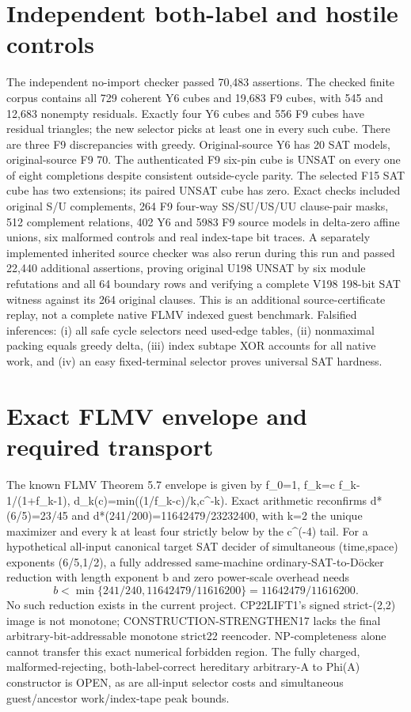 \documentclass[10pt]{article}
\begin{document}
\section{Independent both-label and hostile controls}
The independent no-import checker passed 70,483 assertions. The checked finite corpus contains all 729 coherent Y6 cubes and 19,683 F9 cubes, with 545 and 12,683 nonempty residuals. Exactly four Y6 cubes and 556 F9 cubes have residual triangles; the new selector picks at least one in every such cube. There are three F9 discrepancies with greedy. Original-source Y6 has 20 SAT models, original-source F9 70. The authenticated F9 six-pin cube is UNSAT on every one of eight completions despite consistent outside-cycle parity. The selected F15 SAT cube has two extensions; its paired UNSAT cube has zero. Exact checks included original S/U complements, 264 F9 four-way SS/SU/US/UU clause-pair masks, 512 complement relations, 402 Y6 and 5983 F9 source models in delta-zero affine unions, six malformed controls and real index-tape bit traces. A separately implemented inherited source checker was also rerun during this run and passed 22,440 additional assertions, proving original U198 UNSAT by six module refutations and all 64 boundary rows and verifying a complete V198 198-bit SAT witness against its 264 original clauses. This is an additional source-certificate replay, not a complete native FLMV indexed guest benchmark. Falsified inferences: (i) all safe cycle selectors need used-edge tables, (ii) nonmaximal packing equals greedy delta, (iii) index subtape XOR accounts for all native work, and (iv) an easy fixed-terminal selector proves universal SAT hardness.
\section{Exact FLMV envelope and required transport}
The known FLMV Theorem 5.7 envelope is given by f_0=1, f_k=c f_{k-1}/(1+f_{k-1}), d_k(c)=min((1/f_k-c)/k,c^{-k}). Exact arithmetic reconfirms d*(6/5)=23/45 and d*(241/200)=11642479/23232400, with k=2 the unique maximizer and every k at least four strictly below by the c^(-4) tail. For a hypothetical all-input canonical target SAT decider of simultaneous (time,space) exponents (6/5,1/2), a fully addressed same-machine ordinary-SAT-to-D\"ocker reduction with length exponent b and zero power-scale overhead needs
\[
b<\min\{241/240,11642479/11616200\}=11642479/11616200.
\]
No such reduction exists in the current project. CP22LIFT1's signed strict-(2,2) image is not monotone; CONSTRUCTION-STRENGTHEN17 lacks the final arbitrary-bit-addressable monotone strict22 reencoder. NP-completeness alone cannot transfer this exact numerical forbidden region. The fully charged, malformed-rejecting, both-label-correct hereditary arbitrary-A to Phi(A) constructor is OPEN, as are all-input selector costs and simultaneous guest/ancestor work/index-tape peak bounds.
\end{document}
